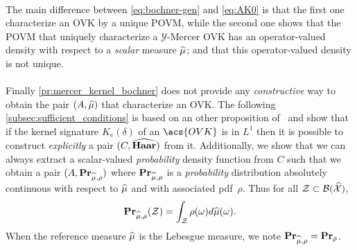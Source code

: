 \paragraph{}
The main difference between \cref{eq:bochner-gen} and
\cref{eq:AK0} is that the first one characterize an \acs{OVK}
by a unique \acf{POVM}, while the second one shows that the \acs{POVM} that
uniquely characterize a $\mathcal{Y}$-Mercer \acs{OVK} has an operator-valued
density with respect to a \emph{scalar} measure $\widehat{\mu}$; and that this
operator-valued density is not unique.
\paragraph{}
Finally \cref{pr:mercer_kernel_bochner} does not provide any
\emph{constructive} way to obtain the pair $(A,\widehat{\mu})$ that characterize
an \acs{OVK}.
The following \cref{subsec:sufficient_conditions} is based on an other
proposition of~\citeauthor{carmeli2006vector} and show that if the kernel
signature $K_e(\delta)$ of an $\acs{OVK}$ is in $L^1$ then it is possible to
construct \emph{explicitly} a pair $(C,\widehat{\mathbf{Haar}})$ from it. Additionally, we
show that we can always extract a scalar-valued \emph{probability} density
function from $C$ such that we obtain a pair
$(A,{\mathbf{{Pr}}}_{\widehat{\mu},\rho})$ where ${\mathbf{{Pr}}}_{\widehat{\mu},\rho}$ is
a \emph{probability} distribution absolutely continuous with respect to
$\widehat{\mu}$ and with associated \ac{pdf}~$\rho$. Thus for all
$\mathcal{Z}\subset\mathcal{B}(\widehat{\mathcal{X}})$,
\begin{dmath*}
    \probability_{\dual{\mu},\rho}(\mathcal{Z})=\int_{\mathcal{Z}}
    \rho(\omega)d\dual{\mu}(\omega).  \end{dmath*}
When the reference measure $\widehat{\mu}$ is the Lebesgue measure, we note
${\mathbf{{Pr}}}_{\widehat{\mu},\rho}={\mathbf{{Pr}}}_\rho$.


